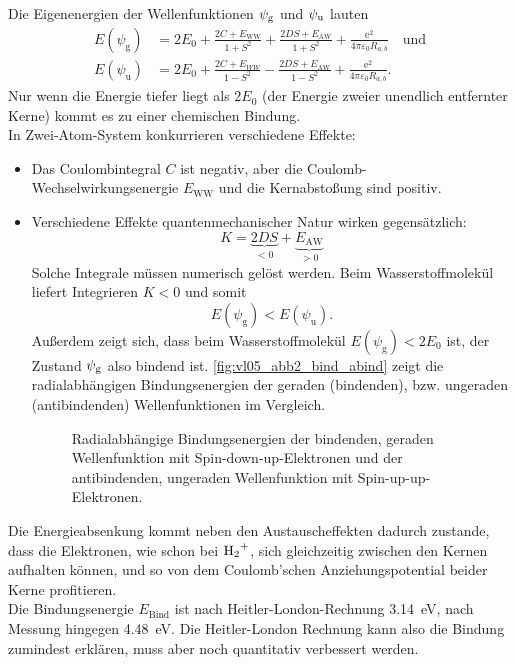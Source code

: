 	Die Eigenenergien der Wellenfunktionen $\psi_\text g$ und $\psi_\text u$ lauten
	\setcounter{equation}{50}
	\begin{align}
		\label{eq:3.51}
		E(\psi_\text{g}) &= 2E_0 + \frac{2C + E_{\text{WW}}}{1 + S^2} + \frac{2DS + E_{\text{AW}}}{1 + S^2} + \frac{\mathrm{e}^2}{4 \pi \varepsilon_0 R_{a,b}} \quad\text{und}\\
		\label{eq:3.52}
		E(\psi_\text{u}) &= 2E_0 + \frac{2C + E_{WW}}{1- S^2}- \frac{2DS + E_{\text{AW}}}{1-S^2} + \frac{\mathrm{e}^2}{4 \pi \varepsilon_{0} R_{a,b}}.
	\end{align}
	Nur wenn die Energie tiefer liegt als $2 E_0$ (der Energie zweier unendlich entfernter Kerne) kommt es zu einer chemischen Bindung.\\
	In Zwei-Atom-System konkurrieren verschiedene Effekte:
	\begin{itemize}
		\item Das Coulombintegral $C$ ist negativ, aber die Coulomb-Wechselwirkungsenergie $E_\text{WW}$ und die Kernabstoßung sind positiv.
		\item Verschiedene Effekte quantenmechanischer Natur wirken gegensätzlich:
			$$
			K = \underbrace{2DS}_{<0} + \underbrace{E_{\text{AW}}}_{>0} 
			$$
			Solche Integrale müssen numerisch gelöst werden. Beim Wasserstoffmolekül liefert Integrieren $K<0$ und somit
			$$
			E\left( \psi_\text{g} \right) < E\left( \psi_\text{u} \right).
			$$ 
			Außerdem zeigt sich, dass beim Wasserstoffmolekül $E \left( \psi_\text{g} \right) < 2 E_0$ ist, der Zustand $\psi_\text g$ also bindend ist.
			\autoref{fig:vl05_abb2_bind_abind} zeigt die radialabhängigen Bindungsenergien der geraden (bindenden), bzw. ungeraden (antibindenden) Wellenfunktionen im Vergleich.
			\begin{figure}[H]
				\centering
				\caption{Radialabhängige Bindungsenergien der bindenden, geraden Wellenfunktion mit Spin-down-up-Elektronen und der antibindenden, ungeraden Wellenfunktion mit Spin-up-up-Elektronen.}
				\label{fig:vl05_abb2_bind_abind}
			\end{figure}
	\end{itemize}
	Die Energieabsenkung kommt neben den Austauscheffekten dadurch zustande, dass die Elektronen, wie schon bei $\ce{H2+}$, sich gleichzeitig zwischen den Kernen aufhalten können, und so von dem Coulomb'schen Anziehungspotential beider Kerne profitieren.\\

	Die Bindungsenergie $E_{\text{Bind}}$ ist nach Heitler-London-Rechnung \SI{3,14}{\electronvolt}, nach Messung hingegen \SI{4,48}{\electronvolt}.
	Die Heitler-London Rechnung kann also die Bindung zumindest erklären, muss aber noch quantitativ verbessert werden.

